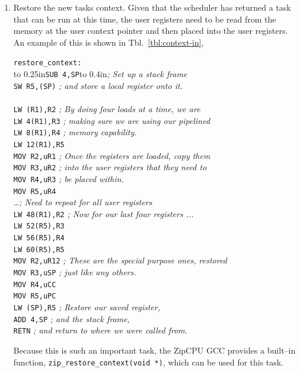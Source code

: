 \documentclass{gqtekspec}
\begin{document}
\begin{enumerate}
\item Restore the new tasks context.  Given that the scheduler has returned a
	task that can be run at this time, the user registers need to be
	read from the memory at the user context pointer and then placed into
	the user registers.  An example of this is shown in
	Tbl.~\ref{tbl:context-in},
\begin{table}\begin{center}
\begin{tabbing}
{\tt restore\_context:} \\
\hbox to 0.25in{}\= {\tt SUB 4,SP}\hbox to 0.4in{}\={\em ; Set up a stack frame} \\
\>	{\tt SW R5,(SP)} \> {\em ; and store a local register onto it.}\\
\\
\>	{\tt LW (R1),R2} \> {\em ; By doing four loads at a time, we are }\\
\>	{\tt LW 4(R1),R3} \> {\em ; making sure we are using our pipelined}\\
\>	{\tt LW 8(R1),R4} \> {\em ; memory capability. }\\
\>	{\tt LW 12(R1),R5} \\
\>	{\tt MOV R2,uR1} \> {\em ; Once the registers are loaded, copy them }\\
\>	{\tt MOV R3,uR2} \> {\em ; into the user registers that they need to}\\
\>	{\tt MOV R4,uR3} \> {\em ; be placed within.} \\
\>	{\tt MOV R5,uR4} \\
	\> \ldots {\em ; Need to repeat for all user registers} \\
\>	{\tt LW 48(R1),R2} \> {\em ; Now for our last four registers ...}\\
\>	{\tt LW 52(R5),R3} \\
\>	{\tt LW 56(R5),R4} \\
\>	{\tt LW 60(R5),R5} \\
\>	{\tt MOV R2,uR12} \> {\em ; These are the special purpose ones, restored }\\
\>	{\tt MOV R3,uSP} \> {\em ; just like any others.}\\
\>	{\tt MOV R4,uCC} \\
\>	{\tt MOV R5,uPC} \\

\>	{\tt LW (SP),R5} \> {\em ; Restore our saved register, } \\
\>	{\tt ADD 4,SP}	\> {\em ; and the stack frame, }\\
\>	{\tt RETN}	\> {\em ; and return to where we were called from.}\\
\end{tabbing}
\caption{Example Restoring User Task Context}\label{tbl:context-in}
\end{center}\end{table}
	Because this is such an important task, the ZipCPU GCC provides a
	built--in function, {\tt zip\_restore\_context(void *)}, which can be
	used for this task.  


\end{enumerate}
\end{document}
